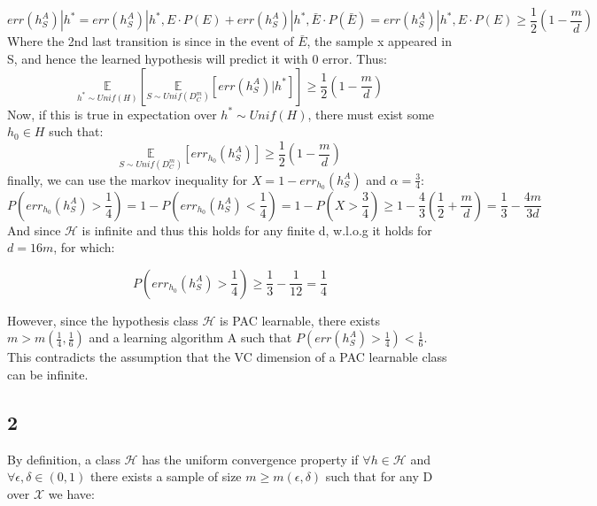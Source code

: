 \begin{equation*}
    err(h_S^A) | h^*  = err(h_S^A) | h^*, E \cdot P(E) + err(h_S^A) | h^*, \bar{E} \cdot P(\bar{E}) = err(h_S^A) | h^*, E \cdot P(E) \geq \frac{1}{2} (1-\frac{m}{d})
\end{equation*}
Where the 2nd last transition is since in the event of $\bar{E}$, the sample x appeared in S, and hence the learned hypothesis will predict it with 0 error. Thus:
\begin{equation*}
    \underset{h^* \sim Unif(H)}{\mathbb{E}} \left[\underset{S \sim Unif(D_C^m)}{\mathbb{E}}  \left[ err(h_S^A) | h^* \right] \right] \geq \frac{1}{2} (1-\frac{m}{d})
\end{equation*}
Now, if this is true in expectation over $h^* \sim Unif(H)$, there must exist some $h_0 \in H$ such that:
\begin{equation*}    
    \underset{S \sim Unif(D_C^m)}{\mathbb{E}}  \left[ err_{h_0}(h_S^A) \right] \geq \frac{1}{2} (1-\frac{m}{d})
\end{equation*}
finally, we can use the markov inequality for $X = 1 - err_{h_0}(h_S^A)$ and $\alpha = \frac{3}{4}$:
\begin{equation*}
    P(err_{h_0}(h_S^A) > \frac{1}{4}) = 1 - P(err_{h_0}(h_S^A) < \frac{1}{4}) = 1 - P(X > \frac{3}{4}) \geq 1 - \frac{4}{3}(\frac{1}{2} + \frac{m}{d}) = \frac{1}{3} - \frac{4m}{3d}
\end{equation*}
And since $\mathcal{H}$ is infinite and thus this holds for any finite d, w.l.o.g it holds for $d=16m$, for which:

\begin{equation*}
    P(err_{h_0}(h_S^A) > \frac{1}{4}) \geq \frac{1}{3} - \frac{1}{12} = \frac{1}{4}
\end{equation*}

However, since the hypothesis class $\mathcal{H}$ is PAC learnable, there exists $m > m(\frac{1}{4}, \frac{1}{6})$ and a learning algorithm A such that $P(err(h_S^A) > \frac{1}{4}) < \frac{1}{6}$.
This contradicts the assumption that the VC dimension of a PAC learnable class can be infinite.


\subsection*{2}
By definition, a class $\mathcal{H}$ has the uniform convergence property if $\forall h \in \mathcal{H}$ and $\forall \epsilon, \delta \in (0, 1)$ there exists a sample of size $m \geq m(\epsilon, \delta)$ such that for any D over $\mathcal{X}$ we have:

